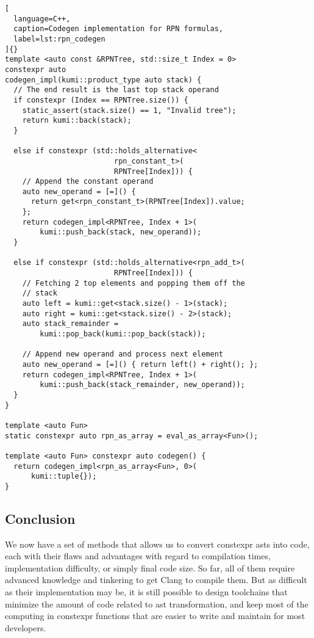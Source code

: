 \documentclass[../main]{subfiles}
\begin{document}
\begin{lstlisting}[
  language=C++,
  caption=Codegen implementation for RPN formulas,
  label=lst:rpn_codegen
]{}
template <auto const &RPNTree, std::size_t Index = 0>
constexpr auto
codegen_impl(kumi::product_type auto stack) {
  // The end result is the last top stack operand
  if constexpr (Index == RPNTree.size()) {
    static_assert(stack.size() == 1, "Invalid tree");
    return kumi::back(stack);
  }

  else if constexpr (std::holds_alternative<
                         rpn_constant_t>(
                         RPNTree[Index])) {
    // Append the constant operand
    auto new_operand = [=]() {
      return get<rpn_constant_t>(RPNTree[Index]).value;
    };
    return codegen_impl<RPNTree, Index + 1>(
        kumi::push_back(stack, new_operand));
  }

  else if constexpr (std::holds_alternative<rpn_add_t>(
                         RPNTree[Index])) {
    // Fetching 2 top elements and popping them off the
    // stack
    auto left = kumi::get<stack.size() - 1>(stack);
    auto right = kumi::get<stack.size() - 2>(stack);
    auto stack_remainder =
        kumi::pop_back(kumi::pop_back(stack));

    // Append new operand and process next element
    auto new_operand = [=]() { return left() + right(); };
    return codegen_impl<RPNTree, Index + 1>(
        kumi::push_back(stack_remainder, new_operand));
  }
}

template <auto Fun>
static constexpr auto rpn_as_array = eval_as_array<Fun>();

template <auto Fun> constexpr auto codegen() {
  return codegen_impl<rpn_as_array<Fun>, 0>(
      kumi::tuple{});
}
\end{lstlisting}

\clearpage%

\subsection{
  Conclusion
}

We now have a set of methods that allows us to convert \gls{constexpr}
\glspl{ast} into \cpp code, each with their flaws and advantages with regard
to compilation times, implementation difficulty, or simply final code size.
So far, all of them require advanced \cpp knowledge and tinkering to get
Clang to compile them. But as difficult as their implementation may be,
it is still possible to design toolchains that minimize the amount of code
related to \gls{ast} transformation, and keep most of the computing in
\gls{constexpr} functions that are easier to write and maintain
for most \cpp developers.
\end{document}
